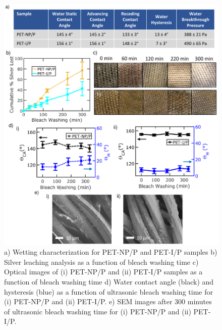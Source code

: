 \documentclass[journal=jacsat,manuscript=article]{achemso}
\begin{document}
\begin{figure}[H]
       \centering
    \includegraphics[width= \linewidth]{Figures/fig_wash2.pdf}
\caption[Wash Durability of samples with PDMS]{a) Wetting characterization for PET-NP/P and PET-I/P samples b) Silver leaching analysis as a function of bleach washing time c) Optical images of (i) PET-NP/P and (ii) PET-I/P samples as a function of bleach washing time d) Water contact angle (black) and hysteresis (blue) as a function of ultrasonic bleach washing time for (i) PET-NP/P and (ii) PET-I/P. e) SEM images after 300 minutes of ultrasonic bleach washing time for (i) PET-NP/P and (ii) PET-I/P.}%
\label{fig:durable2}
\end{figure}
\end{document}
